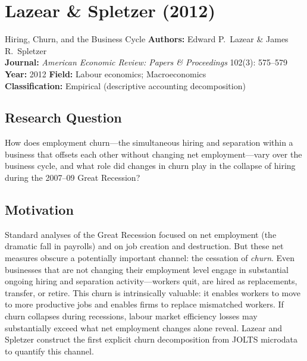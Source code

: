 \chapter{Lazear \& Spletzer (2012)}

\begin{paperbox}{Hiring, Churn, and the Business Cycle}
\textbf{Authors:} Edward P.\ Lazear \& James R.\ Spletzer\\[3pt]
\textbf{Journal:} \textit{American Economic Review: Papers \& Proceedings}
102(3): 575--579\\[3pt]
\textbf{Year:} 2012 \quad\textbf{Field:} Labour economics; Macroeconomics\\[3pt]
\textbf{Classification:} Empirical (descriptive accounting decomposition)
\end{paperbox}

\section{Research Question}

How does employment churn---the simultaneous hiring and separation within a
business that offsets each other without changing net employment---vary over
the business cycle, and what role did changes in churn play in the collapse
of hiring during the 2007--09 Great Recession?

\section{Motivation}

Standard analyses of the Great Recession focused on net employment (the
dramatic fall in payrolls) and on job creation and destruction. But these
net measures obscure a potentially important channel: the cessation of
\emph{churn}. Even businesses that are not changing their employment level
engage in substantial ongoing hiring and separation activity---workers quit,
are hired as replacements, transfer, or retire. This churn is intrinsically
valuable: it enables workers to move to more productive jobs and enables firms
to replace mismatched workers. If churn collapses during recessions, labour
market efficiency losses may substantially exceed what net employment changes
alone reveal. Lazear and Spletzer construct the first explicit churn
decomposition from JOLTS microdata to quantify this channel.

